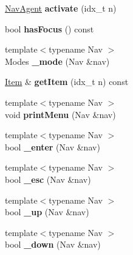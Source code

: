 \begin{DoxyCompactItemize}
\item 
\mbox{\label{classNavTree_a7af483c6aec85b4274360d8f92d5e836}} 
\hyperlink{structNavAgent}{Nav\+Agent} {\bfseries activate} (idx\+\_\+t n)
\item 
\mbox{\label{classNavTree_abc1d0a7abed8fb9af677f9daef621cf2}} 
bool {\bfseries has\+Focus} () const
\item 
\mbox{\label{classNavTree_a923a6e291404bbc936a862747881ceb4}} 
{\footnotesize template$<$typename Nav $>$ }\\Modes {\bfseries \+\_\+mode} (Nav \&nav)
\item 
\mbox{\label{classNavTree_a2f3c9425b8eb4d7fb2713132cb6158af}} 
\hyperlink{structItem}{Item} \& {\bfseries get\+Item} (idx\+\_\+t n) const
\item 
\mbox{\label{classNavTree_aa14842fbd1afb94d92287607f64eed37}} 
{\footnotesize template$<$typename Nav $>$ }\\void {\bfseries print\+Menu} (Nav \&nav)
\item 
\mbox{\label{classNavTree_a59a335171d80f04cb186a3f7bb440c62}} 
{\footnotesize template$<$typename Nav $>$ }\\bool {\bfseries \+\_\+enter} (Nav \&nav)
\item 
\mbox{\label{classNavTree_a7ce107d01a9b9176e7175e4e0d4cac5a}} 
{\footnotesize template$<$typename Nav $>$ }\\bool {\bfseries \+\_\+esc} (Nav \&nav)
\item 
\mbox{\label{classNavTree_a8baf155bad85789b2647a84f2a562bc1}} 
{\footnotesize template$<$typename Nav $>$ }\\bool {\bfseries \+\_\+up} (Nav \&nav)
\item 
\mbox{\label{classNavTree_a4005e0838c582236fa630bfa6ca2f951}} 
{\footnotesize template$<$typename Nav $>$ }\\bool {\bfseries \+\_\+down} (Nav \&nav)
\item 
\mbox{\label{classNavTree_a445f28675d52987e79c9b756052d8847}} 

\end{DoxyCompactItemize}
